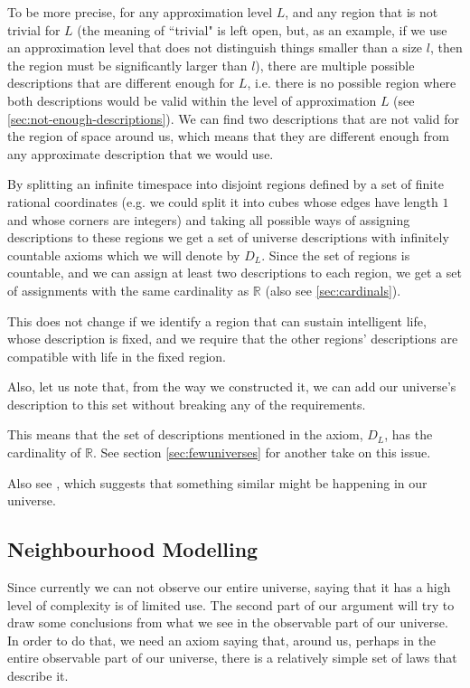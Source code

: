 \documentclass[a4paper
,draft
]{article}
\def\reale{\mathbb{R}}
\def\descriptions{D_L}
\newcommand{\ghilimele}[1]{``#1"}
\begin{document}
To be more precise, for any approximation level $L$, and any region that
is not trivial for $L$
(the meaning of \ghilimele{trivial} is left open, but, as an example,
if we use an approximation level that does not distinguish things smaller
than a size $l$, then the region must be significantly larger than $l$),
there are multiple possible descriptions that
are different enough for $L$, i.e. there is no possible region where both
descriptions
would be valid within the level of approximation $L$
(see \ref{sec:not-enough-descriptions}).
We can find two descriptions that are not valid for the region of space around
us, which means that they are different enough from any approximate
description that we would use.

By splitting an infinite timespace
into disjoint regions defined by a set of finite rational coordinates
(e.g. we could split it into cubes whose edges have length $1$ and whose
corners are integers)
and taking all possible ways of assigning descriptions to these regions
we get a set of universe descriptions with infinitely countable axioms
which we will denote by $\descriptions$.
Since the set of regions is countable, and we can assign at least two
descriptions to each region, we get a set of assignments with the same
cardinality as $\reale$ (also see \ref{sec:cardinals}).

This does not change if we identify a region that can sustain intelligent life,
whose description is fixed,
and we require that the other regions' descriptions are compatible with life
in the fixed region.

Also, let us note that, from the way we constructed it, we can add our
universe's description to this set without breaking any of the requirements.

This means that the set of descriptions mentioned in the axiom,
$\descriptions$, has the cardinality of $\reale$. See section
\ref{sec:fewuniverses} for another take on this issue.

Also see \parencite{Manson2003}, which suggests that something similar
might be happening in our universe.

\subsection{Neighbourhood Modelling}

Since currently we can not observe our entire universe, saying that it has a
high level of complexity is of limited use.
The second part of our argument will try to draw some conclusions from
what we see in the observable part of our universe.
In order to do that, we need an axiom saying that, around us, perhaps in the
entire observable part of our universe, there is a relatively simple
set of laws that describe it.
\end{document}
